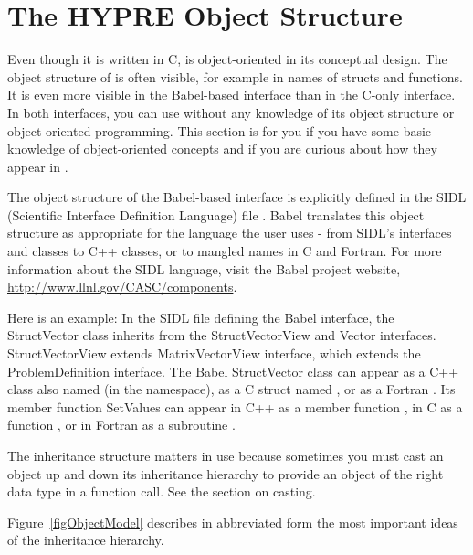 \section{The HYPRE Object Structure}

Even though it is written in C, \hypre{} is object-oriented in its
conceptual design.  The object structure of \hypre{} is often visible,
for example in names of structs and functions.  It is even more
visible in the Babel-based interface than in the C-only interface.  In
both interfaces, you can use \hypre{} without any knowledge of its
object structure or object-oriented programming.  This section is for
you if you have some basic knowledge of object-oriented concepts and
if you are curious about how they appear in \hypre{}.

The object structure of the Babel-based interface is explicitly
defined in the SIDL (Scientific Interface Definition Language) file
.  Babel translates this object structure as
appropriate for the language the user uses - from SIDL's interfaces
and classes to C++ classes, or to mangled names in C and Fortran.
For more information about the SIDL language, visit the Babel project
website, \url{http://www.llnl.gov/CASC/components}.

Here is an example: In the SIDL file defining the Babel interface, the
StructVector class inherits from the StructVectorView and Vector
interfaces.  StructVectorView extends MatrixVectorView interface,
which extends the ProblemDefinition interface.  The Babel StructVector
class can appear as a C++ class also named  (in the
 namespace), as a C struct named
, or as a Fortran
.  Its member function SetValues can appear in C++ as a
member function , in C as a function
, or in Fortran as a subroutine
.

The inheritance structure matters in use because sometimes you must
cast an object up and down its inheritance hierarchy to provide an
object of the right data type in a function call.  See the section on
casting.

Figure~\ref{figObjectModel} describes in abbreviated form the most
important ideas of the \hypre{} inheritance hierarchy.



